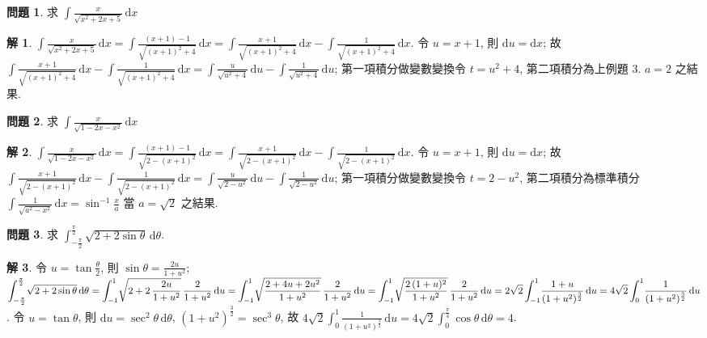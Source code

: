 \documentclass[12pt]{extarticle}
\newcommand{\ds}{\displaystyle}
\theoremstyle{definition}
\newtheorem*{ex}{問題}
\newtheorem*{sol}{解}
\begin{document}
\begin{ex}
  求 $\ds\int\!\frac{x}{\sqrt{x^2 + 2x + 5}}\,\text{d}x$
\end{ex}
    
\begin{sol}
  $\ds\int\!\frac{x}{\sqrt{x^2 + 2x + 5}}\,\text{d}x = \int\!\frac{(x + 1) - 1}{\sqrt{(x + 1)^2 + 4}}\,\text{d}x = \int\!\frac{x + 1}{\sqrt{(x + 1)^2 + 4}}\,\text{d}x - \int\!\frac{1}{\sqrt{(x + 1)^2 + 4}}\,\text{d}x$. 令 $u = x + 1$, 則 $\ds\text{d}u = \text{d}x$; 故 $\ds\int\!\frac{x + 1}{\sqrt{(x + 1)^2 + 4}}\,\text{d}x - \int\!\frac{1}{\sqrt{(x + 1)^2 + 4}}\,\text{d}x = \int\!\frac{u}{\sqrt{u^2 + 4}}\,\text{d}u - \int\!\frac{1}{\sqrt{u^2 + 4}}\,\text{d}u$; 第一項積分做變數變換令 $t = u^2 + 4$, 第二項積分為上例題 3. $a = 2$ 之結果.  
\end{sol}

\begin{ex}
  求 $\ds\int\!\frac{x}{\sqrt{1 - 2x - x^2}}\,\text{d}x$
\end{ex}
    
\begin{sol}
$\ds\int\!\frac{x}{\sqrt{1 - 2x - x^2}}\,\text{d}x = \int\!\frac{(x + 1) - 1}{\sqrt{2 - (x + 1)^2}}\,\text{d}x = \int\!\frac{x + 1}{\sqrt{2 - (x + 1)^2}}\,\text{d}x - \int\!\frac{1}{\sqrt{2 - (x + 1)^2}}\,\text{d}x$. 令 $u = x + 1$, 則 $\ds\text{d}u = \text{d}x$; 故 $\ds\int\!\frac{x + 1}{\sqrt{2 - (x + 1)^2}}\,\text{d}x - \int\!\frac{1}{\sqrt{2 - (x + 1)^2}}\,\text{d}x = \int\!\frac{u}{\sqrt{2 - u^2}}\,\text{d}u - \int\!\frac{1}{\sqrt{2 - u^2}}\,\text{d}u$; 第一項積分做變數變換令 $t = 2 - u^2$, 第二項積分為標準積分 $\ds\int\!\frac{1}{\sqrt{a^2 - x^2}}\,\text{d}x = \sin^{-1}\!\frac{x}{a}$ 當 $a = \sqrt{2}$ 之結果.  
\end{sol}

\begin{ex}
  求 $\ds\int_{-\frac{\pi}{2}}^{\frac{\pi}{2}}\!\sqrt{2 + 2\sin\theta}\,\text{d}\theta$.
\end{ex}

\begin{sol}
  令 $\ds u = \tan\frac{\theta}{2}$, 則 $\ds\sin\theta = \frac{2 u}{1 + u^2}$; $\ds\int_{-\frac{\pi}{2}}^{\frac{\pi}{2}}\!\sqrt{2 + 2\sin\theta}\,\text{d}\theta = \int_{-1}^{1}\!\sqrt{2 + 2\,\frac{2u}{1 + u^2}}\,\frac{2}{1 + u^2}\,\text{d}u \\= \int_{-1}^{1}\!\sqrt{\frac{2 + 4u + 2u^2}{1 + u^2}}\,\frac{2}{1 + u^2}\,\text{d}u = \int_{-1}^{1}\!\sqrt{\frac{2\,(1 + u)^2}{1 + u^2}}\,\frac{2}{1 + u^2}\,\text{d}u = 2\sqrt{2}\int_{-1}^{1}\!\frac{1 + u}{(1 + u^2)^{\frac{3}{2}}}\,\text{d}u = 4\sqrt{2}\int_{0}^{1}\!\frac{1}{(1 + u^2)^{\frac{3}{2}}}\,\text{d}u$. 令 $\ds u = \tan\theta$, 則 $\ds\text{d}u = \sec^2\theta\,\text{d}\theta$, $\ds(1 + u^2)^{\frac{3}{2}} = \sec^3\theta$, 故 $\ds 4\sqrt{2}\int_0^{1}\!\frac{1}{(1 + u^2)^{\frac{3}{2}}}\,\text{d}u = 4\sqrt{2}\int_0^{\frac{\pi}{4}}\cos\theta\,\text{d}\theta = 4$. 
\end{sol}
\end{document}
